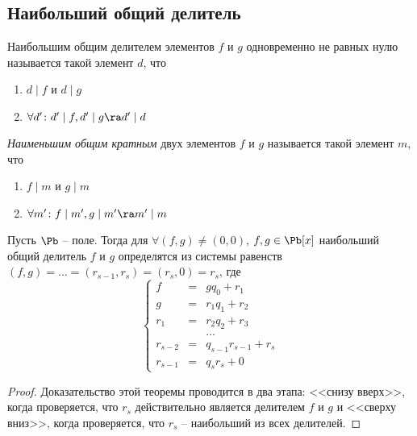 \subsection{Наибольший общий делитель}

\begin{df}
Наибольшим общим делителем элементов $f$ и $g$ одновременно не равных нулю называется такой элемент $d$, что
 \begin{enumerate}
   \item $d\mid f$ и $d\mid g$
   \item $\forall d'\colon d'\mid f,d'\mid g\ra d'\mid d$
 \end{enumerate}
\end{df}


\begin{df}
  \emph{Наименьшим общим кратным} двух элементов $f$ и $g$ называется такой элемент $m$, что
 \begin{enumerate}
   \item $f\mid m$ и $g\mid m$
   \item $\forall m'\colon f\mid m',g\mid m'\ra m'\mid m$
 \end{enumerate}
\end{df}

\begin{theorem}
  Пусть $\Pb$ -- поле. Тогда для $\forall (f,g)\ne(0,0)$, $f,g\in\Pb[x]$ наибольший общий делитель $f$ и $g$ определятся из системы равенств $(f,g)=\dots=(r_{s-1},r_s)=(r_s,0)=r_s$, где
  $$
   \left\{
     \begin{array}{lll}
       f  &=&   gq_0 + r_1\\
       g  &=& r_1q_1 + r_2\\
       r_1&=& r_2q_2 + r_3\\
       &&\dots\\
       r_{s-2}&=&q_{s-1}r_{s-1}+r_s\\
       r_{s-1}&=&q_sr_s + 0
     \end{array}
   \right.
  $$
\end{theorem}
\begin{proof}
  Доказательство этой теоремы проводится в два этапа: <<снизу вверх>>, когда проверяется, что $r_s$ действительно является делителем $f$ и $g$ и <<сверху вниз>>, когда проверяется, что $r_s$ -- наибольший из всех делителей.
\end{proof}

